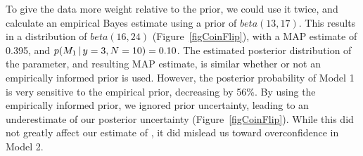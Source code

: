 \documentclass[letterpaper,12pt]{article}
\begin{document}
\begin{linenumbers}
To give the data more weight relative to the prior, we could use it twice, and
calculate an empirical Bayes estimate using a prior of $beta(13,17)$.
This results in a distribution of $beta(16, 24)$ (Figure~\ref{figCoinFlip}),
with a MAP estimate of 0.395, and $p(M_1 \,|\, y=3, N=10) = 0.10$.
The estimated posterior distribution of the parameter, and resulting MAP
estimate, is similar whether or not an empirically informed prior is used.
However, the posterior probability of Model 1 is very sensitive to the
empirical prior, decreasing by 56\%.
By using the empirically informed prior, we ignored prior uncertainty, leading
to an underestimate of our posterior uncertainty (Figure~\ref{figCoinFlip}).
While this did not greatly affect our estimate of \myTheta{}, it did mislead us
toward overconfidence in Model 2.




\end{linenumbers}
\end{document}
